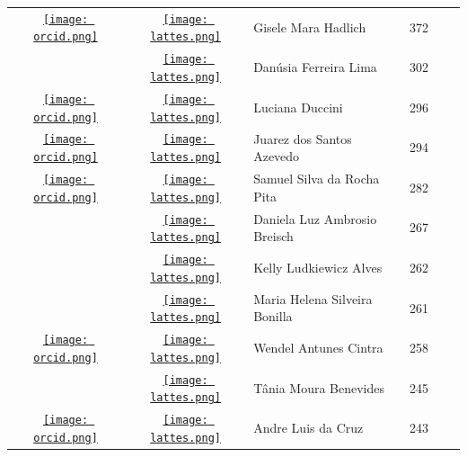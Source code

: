 \documentclass[12pt,brazil]{article}\usepackage[]{graphicx}\usepackage[]{xcolor}
\begin{document}
\begin{longtable}{cclrll}
\href{https://orcid.org/0000-0002-6304-0988}{\texttt{[image: orcid.png]}} & \href{http://lattes.cnpq.br/0146453135230315}{\texttt{[image: lattes.png]}} & Gisele Mara Hadlich & 372 &  &  \\

 & \href{http://lattes.cnpq.br/3488835911770590}{\texttt{[image: lattes.png]}} & Danúsia Ferreira Lima & 302 &  &  \\

\href{https://orcid.org/0000-0001-8430-683X}{\texttt{[image: orcid.png]}} & \href{http://lattes.cnpq.br/4955543481325525}{\texttt{[image: lattes.png]}} & Luciana Duccini & 296 &  &  \\

\href{https://orcid.org/0000-0002-3641-7604}{\texttt{[image: orcid.png]}} & \href{http://lattes.cnpq.br/1750344103498728}{\texttt{[image: lattes.png]}} & Juarez dos Santos Azevedo & 294 &  &  \\

\href{https://orcid.org/0000-0003-4053-8721}{\texttt{[image: orcid.png]}} & \href{http://lattes.cnpq.br/8313800478632324}{\texttt{[image: lattes.png]}} & Samuel Silva da Rocha Pita & 282 &  &  \\

 & \href{http://lattes.cnpq.br/4565288308885394}{\texttt{[image: lattes.png]}} & Daniela Luz Ambrosio Breisch & 267 &  &  \\

 & \href{http://lattes.cnpq.br/4826659465325371}{\texttt{[image: lattes.png]}} & Kelly Ludkiewicz Alves & 262 &  &  \\

 & \href{http://lattes.cnpq.br/2730520955520609}{\texttt{[image: lattes.png]}} & Maria Helena Silveira Bonilla & 261 &  &  \\

\href{https://orcid.org/0000-0001-6075-8938}{\texttt{[image: orcid.png]}} & \href{http://lattes.cnpq.br/0111570761757444}{\texttt{[image: lattes.png]}} & Wendel Antunes Cintra & 258 &  &  \\

 & \href{http://lattes.cnpq.br/2494548196605610}{\texttt{[image: lattes.png]}} & Tânia Moura Benevides & 245 &  &  \\

\href{https://orcid.org/0000-0003-1638-4398}{\texttt{[image: orcid.png]}} & \href{http://lattes.cnpq.br/7861151975882619}{\texttt{[image: lattes.png]}} & Andre Luis da Cruz & 243 &  &  \\


\end{longtable}
\end{document}
